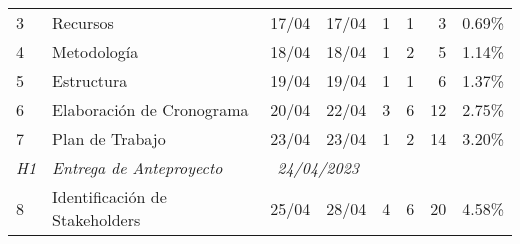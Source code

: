 \begin{longtable}[c]{llccrrrr}
	{\color[HTML]{656565} 3}               & {\color[HTML]{656565} Recursos}                                        & {\color[HTML]{656565} 17/04}                     & {\color[HTML]{656565} 17/04}                     & {\color[HTML]{656565} 1}          & {\color[HTML]{656565} 1}           & {\color[HTML]{656565} 3}             & {\color[HTML]{656565} 0.69\%}       \\
	{\color[HTML]{656565} 4}               & {\color[HTML]{656565} Metodología}                                     & {\color[HTML]{656565} 18/04}                     & {\color[HTML]{656565} 18/04}                     & {\color[HTML]{656565} 1}          & {\color[HTML]{656565} 2}           & {\color[HTML]{656565} 5}             & {\color[HTML]{656565} 1.14\%}       \\
	{\color[HTML]{656565} 5}               & {\color[HTML]{656565} Estructura}                                      & {\color[HTML]{656565} 19/04}                     & {\color[HTML]{656565} 19/04}                     & {\color[HTML]{656565} 1}          & {\color[HTML]{656565} 1}           & {\color[HTML]{656565} 6}             & {\color[HTML]{656565} 1.37\%}       \\
	{\color[HTML]{656565} 6}               & {\color[HTML]{656565} Elaboración de Cronograma}                       & {\color[HTML]{656565} 20/04}                     & {\color[HTML]{656565} 22/04}                     & {\color[HTML]{656565} 3}          & {\color[HTML]{656565} 6}           & {\color[HTML]{656565} 12}            & {\color[HTML]{656565} 2.75\%}       \\
	{\color[HTML]{656565} 7}               & {\color[HTML]{656565} Plan de Trabajo}                                 & {\color[HTML]{656565} 23/04}                     & {\color[HTML]{656565} 23/04}                     & {\color[HTML]{656565} 1}          & {\color[HTML]{656565} 2}           & {\color[HTML]{656565} 14}            & {\color[HTML]{656565} 3.20\%}       \\
	\textit{H1}                            & \textit{Entrega de Anteproyecto}                                       & \multicolumn{2}{c}{\textit{24/04/2023}}          & \textit{}                                        & \textit{}                         & \textit{}                          & \textit{}                                                                  \\
	{\color[HTML]{656565} 8}               & {\color[HTML]{656565} Identificación de Stakeholders}                  & {\color[HTML]{656565} 25/04}                     & {\color[HTML]{656565} 28/04}                     & {\color[HTML]{656565} 4}          & {\color[HTML]{656565} 6}           & {\color[HTML]{656565} 20}            & {\color[HTML]{656565} 4.58\%}       \\

\end{longtable}
